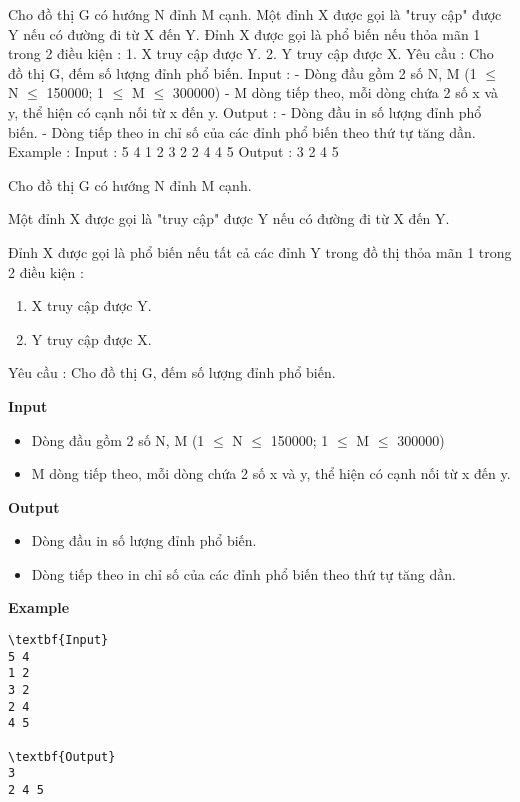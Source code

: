 

Cho đồ thị G có hướng N đỉnh M cạnh. Một đỉnh X được gọi là "truy cập" được Y nếu có đường đi từ X đến Y. Đỉnh X được gọi là phổ biến nếu thỏa mãn 1 trong 2 điều kiện : 1. X truy cập được Y. 2. Y truy cập được X. Yêu cầu : Cho đồ thị G, đếm số lượng đỉnh phổ biến. Input : - Dòng đầu gồm 2 số N, M (1  $\le$  N  $\le$  150000; 1  $\le$  M  $\le$  300000) - M dòng tiếp theo, mỗi dòng chứa 2 số x và y, thể hiện có cạnh nối từ x đến y. Output : - Dòng đầu in số lượng đỉnh phổ biến. - Dòng tiếp theo in chỉ số của các đỉnh phổ biến theo thứ tự tăng dần. Example : Input : 5 4 1 2 3 2 2 4 4 5 Output : 3 2 4 5

Cho đồ thị G có hướng N đỉnh M cạnh.

Một đỉnh X được gọi là "truy cập" được Y nếu có đường đi từ X đến Y.

Đỉnh X được gọi là phổ biến nếu tất cả các đỉnh Y trong đồ thị thỏa mãn 1 trong 2 điều kiện :
\begin{enumerate}
	\item X truy cập được Y.
	\item Y truy cập được X.
\end{enumerate}

Yêu cầu : Cho đồ thị G, đếm số lượng đỉnh phổ biến.

\textbf{Input}
\begin{itemize}
	\item Dòng đầu gồm 2 số N, M (1  $\le$  N  $\le$  150000; 1  $\le$  M  $\le$  300000)
	\item M dòng tiếp theo, mỗi dòng chứa 2 số x và y, thể hiện có cạnh nối từ x đến y.
\end{itemize}

\textbf{Output}
\begin{itemize}
	\item Dòng đầu in số lượng đỉnh phổ biến.
	\item Dòng tiếp theo in chỉ số của các đỉnh phổ biến theo thứ tự tăng dần.
\end{itemize}

\textbf{Example}
\begin{verbatim}
\textbf{Input}
5 4
1 2
3 2
2 4
4 5

\textbf{Output}
3
2 4 5

\end{verbatim}
